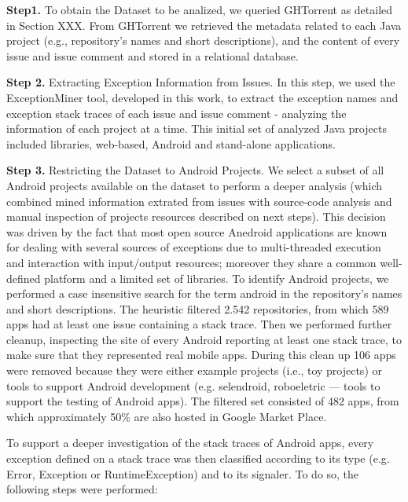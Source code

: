 \documentclass[conference]{IEEEtran}
\begin{document}

\textbf{Step1.} To obtain the Dataset to be analized, we queried GHTorrent as detailed in Section XXX. From GHTorrent we retrieved the metadata related to each Java project (e.g., 
repository's names and short descriptions), and the content of every issue and issue comment 
and stored in a relational database.

\textbf{Step 2.} Extracting Exception Information from Issues. In this step, we used the ExceptionMiner tool,
 developed in this work, to extract the exception names and exception stack traces of each
 issue and issue comment - analyzing the information of each project at a time. This initial 
set of analyzed Java projects included libraries, web-based, Android and stand-alone applications.  

\textbf{Step 3.} Restricting the Dataset to Android Projects. We select a subset of all Android 
projects available on the dataset to perform a deeper analysis (which combined mined
 information extrated from issues with source-code analysis and manual inspection 
of projects resources described on next steps). This decision was driven by the
fact that most open source Anedroid applications are known for dealing
with several sources of exceptions due to multi-threaded execution and
interaction with input/output resources; moreover they share a common
well-defined platform and a limited set of libraries.
To identify Android projects, we performed a case insensitive search for 
the term \textsf{android} in the repository's names and short descriptions.  The
heuristic filtered 2.542 repositories, from which 589 apps had at least one
issue containing a stack trace. Then we performed further cleanup, inspecting the site of every Android
reporting at least one stack trace, to make sure that they represented real
mobile apps. During this clean up 106 apps were removed because they were either
example projects (i.e., toy projects) or tools to support Android development
(e.g. \textsf{selendroid}, \textsf{roboeletric} --- tools to support the testing of Android apps).
The filtered set consisted of 482 apps, from which approximately 50\% are also
hosted in Google Market Place. 

To support a deeper investigation of the stack traces of Android apps, every
exception defined on a stack trace was then classified according to its type
(e.g. Error, Exception or RuntimeException) and to its signaler. To do so, the following 
steps were performed:
\end{document}

